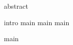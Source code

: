 


\usepackage{hyperref}



\maketitle

{abstract}

\tableofcontents

{intro}
{main}
{main}
{main}

{main}

